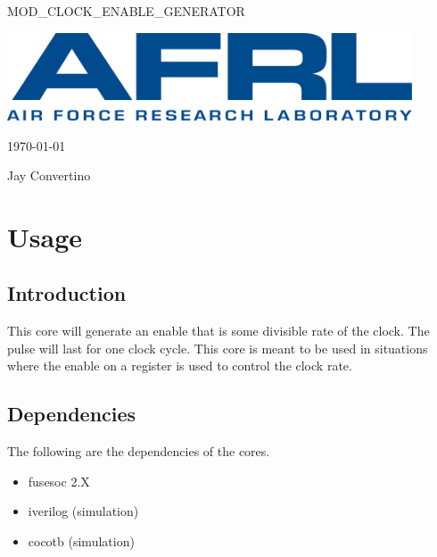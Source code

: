 \begin{titlepage}
  \begin{center}

  {\Huge MOD\_CLOCK\_ENABLE\_GENERATOR}

  \vspace{25mm}

  \includegraphics[width=0.90\textwidth,height=\textheight,keepaspectratio]{img/AFRL.png}

  \vspace{25mm}

  \today

  \vspace{15mm}

  {\Large Jay Convertino}

  \end{center}
\end{titlepage}

\tableofcontents

\newpage

\section{Usage}

\subsection{Introduction}

\par
This core will generate an enable that is some divisible rate of the clock. The pulse will last for one clock cycle. This
core is meant to be used in situations where the enable on a register is used to control the clock rate.

\subsection{Dependencies}

\par
The following are the dependencies of the cores.

\begin{itemize}
  \item fusesoc 2.X
  \item iverilog (simulation)
  \item cocotb (simulation)
\end{itemize}

